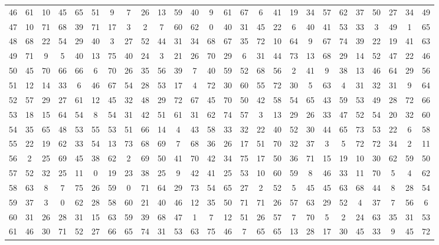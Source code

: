 \begin{table}
\begin{tabular}{c c c c c c c c c c c c c c c c c c c c c c c c c c }
46 & 61 & 10 & 45 & 65 & 51 & 9 & 7 & 26 & 13 & 59 & 40 & 9 & 61 & 67 & 6 & 41 & 19 & 34 & 57 & 62 & 37 & 50 & 27 & 34 & 49 \\
47 & 10 & 71 & 68 & 39 & 71 & 17 & 3 & 2 & 7 & 60 & 62 & 0 & 40 & 31 & 45 & 22 & 6 & 40 & 41 & 53 & 33 & 3 & 49 & 1 & 65 \\
48 & 68 & 22 & 54 & 29 & 40 & 3 & 27 & 52 & 44 & 31 & 34 & 68 & 67 & 35 & 72 & 10 & 64 & 9 & 67 & 74 & 39 & 22 & 19 & 41 & 63 \\
49 & 71 & 9 & 5 & 40 & 13 & 75 & 40 & 24 & 3 & 21 & 26 & 70 & 29 & 6 & 31 & 44 & 73 & 13 & 68 & 29 & 14 & 52 & 47 & 22 & 46 \\
50 & 45 & 70 & 66 & 66 & 6 & 70 & 26 & 35 & 56 & 39 & 7 & 40 & 59 & 52 & 68 & 56 & 2 & 41 & 9 & 38 & 13 & 46 & 64 & 29 & 56 \\
51 & 12 & 14 & 33 & 6 & 46 & 67 & 54 & 28 & 53 & 17 & 4 & 72 & 30 & 60 & 55 & 72 & 30 & 5 & 63 & 4 & 31 & 32 & 31 & 9 & 64 \\
52 & 57 & 29 & 27 & 61 & 12 & 45 & 32 & 48 & 29 & 72 & 67 & 45 & 70 & 50 & 42 & 58 & 54 & 65 & 43 & 59 & 53 & 49 & 28 & 72 & 66 \\
53 & 18 & 15 & 64 & 54 & 8 & 54 & 31 & 42 & 51 & 61 & 31 & 62 & 74 & 57 & 3 & 13 & 29 & 26 & 33 & 47 & 52 & 54 & 20 & 32 & 60 \\
54 & 35 & 65 & 48 & 53 & 55 & 53 & 51 & 66 & 14 & 4 & 43 & 58 & 33 & 32 & 22 & 40 & 52 & 30 & 44 & 65 & 73 & 53 & 22 & 6 & 58 \\
55 & 22 & 19 & 62 & 33 & 54 & 13 & 73 & 68 & 69 & 7 & 68 & 36 & 26 & 17 & 51 & 70 & 32 & 37 & 3 & 5 & 72 & 72 & 34 & 2 & 11 \\
56 & 2 & 25 & 69 & 45 & 38 & 62 & 2 & 69 & 50 & 41 & 70 & 42 & 34 & 75 & 17 & 50 & 36 & 71 & 15 & 19 & 10 & 30 & 62 & 59 & 50 \\
57 & 52 & 32 & 25 & 11 & 0 & 19 & 23 & 38 & 25 & 9 & 42 & 41 & 25 & 53 & 10 & 60 & 59 & 8 & 46 & 33 & 11 & 70 & 5 & 4 & 62 \\
58 & 63 & 8 & 7 & 75 & 26 & 59 & 0 & 71 & 64 & 29 & 73 & 54 & 65 & 27 & 2 & 52 & 5 & 45 & 45 & 63 & 68 & 44 & 8 & 28 & 54 \\
59 & 37 & 3 & 0 & 62 & 28 & 58 & 60 & 21 & 40 & 46 & 12 & 35 & 50 & 71 & 71 & 26 & 57 & 63 & 29 & 52 & 4 & 37 & 7 & 56 & 6 \\
60 & 31 & 26 & 28 & 31 & 15 & 63 & 59 & 39 & 68 & 47 & 1 & 7 & 12 & 51 & 26 & 57 & 7 & 70 & 5 & 2 & 24 & 63 & 35 & 31 & 53 \\
61 & 46 & 30 & 71 & 52 & 27 & 66 & 65 & 74 & 31 & 53 & 63 & 75 & 46 & 7 & 65 & 65 & 13 & 28 & 17 & 30 & 45 & 33 & 9 & 45 & 72 \\

\end{tabular}
\end{table}
